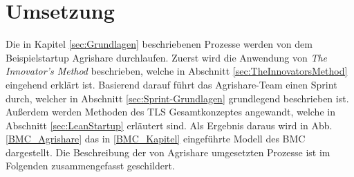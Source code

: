 \chapter{Umsetzung}
\label{sec:Umsetzung}
Die in Kapitel \ref{sec:Grundlagen} beschriebenen Prozesse werden von dem Beispielstartup Agrishare durchlaufen. Zuerst wird die Anwendung von \textit{The Innovator's Method} beschrieben, welche in Abschnitt \ref{sec:TheInnovatorsMethod} eingehend erklärt ist. Basierend darauf führt das Agrishare-Team einen Sprint durch, welcher in Abschnitt \ref{sec:Sprint-Grundlagen} grundlegend beschrieben ist. Außerdem werden Methoden des \ac{TLS} Gesamtkonzeptes angewandt, welche in Abschnitt \ref{sec:LeanStartup} erläutert sind. Als Ergebnis daraus wird in Abb. \ref{BMC_Agrishare} das in \ref{BMC_Kapitel} eingeführte Modell des \ac{BMC} dargestellt. Die Beschreibung der von Agrishare umgesetzten Prozesse ist im Folgenden zusammengefasst geschildert.



